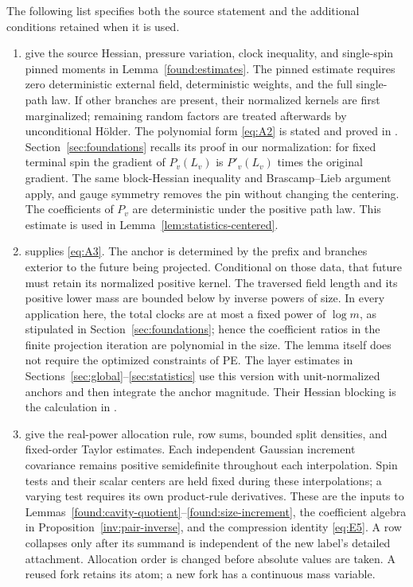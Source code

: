 The following list specifies both the source statement and the additional
conditions retained when it is used.
\begin{enumerate}
\item \cite[Lemmas~2.1--2.3, equation~(1)]{PE} give the source Hessian,
pressure variation, clock inequality, and single-spin pinned moments in
Lemma~\ref{found:estimates}. The pinned estimate requires zero deterministic
external field, deterministic weights, and the full single-path law. If
other branches are present, their normalized kernels are first marginalized;
remaining random factors are treated afterwards by unconditional H\"older.
The polynomial form \eqref{eq:A2} is stated and proved in
\cite[Appendix, ``Source and pressure calculus; the scope of pinned
moments'']{PE}. Section~\ref{sec:foundations} recalls its proof in our
normalization: for fixed terminal spin the gradient of $P_v(L_v)$ is
$P'_v(L_v)$ times the original gradient. The same block-Hessian
inequality and Brascamp--Lieb argument apply, and gauge symmetry removes
the pin without changing the centering. The coefficients of $P_v$ are
deterministic under the positive path law. This estimate is used in
Lemma~\ref{lem:statistics-centered}.

\item \cite[Lemma~3.5, equation~(13)]{PE} supplies \eqref{eq:A3}.
The anchor is determined by the prefix and branches exterior to the
future being projected. Conditional on those data, that future must
retain its normalized positive kernel. The traversed field length and
its positive lower mass are bounded below by inverse powers of size.
In every application here, the total clocks are at most a fixed power
of $\log m$, as stipulated in Section~\ref{sec:foundations}; hence the
coefficient ratios in the finite projection iteration are polynomial
in the size. The lemma itself does not require the optimized constraints
of PE.
The layer estimates in Sections~\ref{sec:global}--\ref{sec:statistics}
use this version with unit-normalized anchors and then integrate the
anchor magnitude. Their Hessian blocking is the calculation in
\cite[proof of Proposition~3.4, preceding equation~(15)]{PE}.

\item \cite[Proposition~2.5, Lemmas~2.6, 2.8 and~2.9, equation~(2)]{PE}
give the real-power allocation rule, row sums, bounded split densities,
and fixed-order Taylor estimates. Each independent Gaussian increment
covariance remains positive semidefinite throughout each interpolation.
Spin tests and their scalar centers
are held fixed during these interpolations; a varying test requires its
own product-rule derivatives. These are the inputs to
Lemmas~\ref{found:cavity-quotient}--\ref{found:size-increment}, the
coefficient algebra in Proposition~\ref{inv:pair-inverse}, and the
compression identity \eqref{eq:E5}. A row collapses only after its
summand is independent of the new label's detailed attachment.
Allocation order is changed before absolute values are taken. A reused
fork retains its atom; a new fork has a continuous mass variable.


\end{enumerate}

